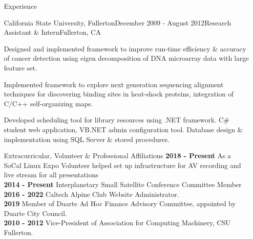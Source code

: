 \documentclass{resume} %
\begin{document}
\begin{rSection}{Experience}
\begin{rSubsection}{California State University, Fullerton}{December 2009 - August 2012}{Research Assistant \& Intern}{Fullerton, CA}
\item Designed and implemented framework to improve run-time efficiency \& accuracy of cancer detection using eigen decomposition of DNA microarray data with large feature set.
\item Implemented framework to explore next generation sequencing alignment techniques for discovering binding sites in heat-shock proteins, integration of C/C++ self-organizing maps.
\item Developed scheduling tool for library resources using .NET framework. C\# student web application, VB.NET admin configuration tool. Database design \& implementation using SQL Server \& stored procedures.
\end{rSubsection}
\end{rSection}


\begin{rSection}{ Extracurricular, Volunteer \& Professional Affiliations}
{\bf 2018 - Present} As a SoCal Linux Expo Volunteer helped set up infrastructure for A\/V recording and live stream for all presentations\\
{\bf 2014 - Present} Interplanetary Small Satellite Conference Committee Member\\
{\bf 2016 - 2022} Caltech Alpine Club Website Administrator. \\
{\bf 2019} Member of Duarte Ad Hoc Finance Advisory Committee, appointed by Duarte City Council. \\
{\bf 2010 - 2012} Vice-President of Association for Computing Machinery, CSU Fullerton. 
\end{rSection}





\end{document}
